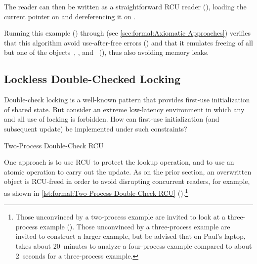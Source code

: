 \begin{fcvref}
The reader can then be written as a straightforward RCU reader
(),
loading the current pointer on  and
dereferencing it on .

Running this example
()
through 
(see \cref{sec:formal:Axiomatic Approaches})
verifies that this algorithm avoid use-after-free errors () and that it
emulates freeing of all but one of the objects~, , and~
(), thus also avoiding memory leaks.
\end{fcvref}

\subsection{Lockless Double-Checked Locking}
\label{sec:together:Lockless Double-Checked Locking}

Double-check locking is a well-known pattern that provides first-use
initialization of shared state.
But consider an extreme low-latency environment in which any and all
use of locking is forbidden.
How can first-use initialization (and subsequent update) be implemented
under such constraints?

\begin{listing}
\caption{Two-Process Double-Check RCU}
\label{lst:formal:Two-Process Double-Check RCU}
\end{listing}

One approach is to use RCU to protect the lookup operation, and to use
an atomic  operation to carry out the update.
As on the prior section, an overwritten object is RCU-freed in order to
avoid disrupting concurrent readers, for example, as shown in
\cref{lst:formal:Two-Process Double-Check RCU}
().\footnote{
	Those unconvinced by a two-process example are invited to look
	at a three-process example
	().
	Those unconvinced by a three-process example are invited to
	construct a larger example, but be advised that on Paul's laptop,
	 takes about 20~minutes to analyze a four-process
	example compared to about 2~seconds for a three-process example.}

